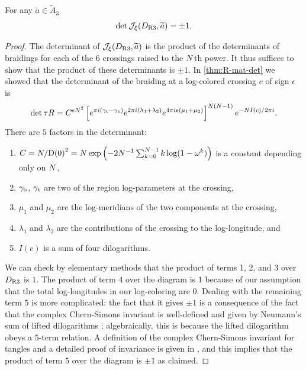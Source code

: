 \documentclass{sl2ams}
\numberwithin{equation}{section}
\begin{document}
\begin{lemma}
  \label{thm:cocyle-condition}
  For any \(\widetilde{a} \in \widetilde{A}_{3}\)
  \[
    \det \jfunc(D_{\RIII}, \widetilde a) = \pm 1
    .\qedhere
  \]
\end{lemma}
\begin{proof}
  The determinant of \(\jfunc(D_{\RIII}, \widetilde a)\) is the product of the determinants of braidings for each of the \(6\) crossings raised to the \(N\)th power.
  It thus suffices to show that the product of these determinants is \(\pm 1\).
  In \cref{thm:R-mat-det} we showed that the determinant of the braiding at a log-colored crossing \(c\) of sign \(\epsilon\) is
  \begin{equation*}
    \det \tau R
    =
    C^{\epsilon N^2}
    \left[
      e^{\pi i (\gamma_{\mathrm{t}} - \gamma_{\mathrm{b}}) }
      e^{2\pi i(\lambda_{1} + \lambda_{2})}
      e^{4\pi i \epsilon(\mu_{1} + \mu_{2})}
    \right]^{N(N-1)}
    e^{- N I(c) / 2\pi i}
    .
  \end{equation*}
  There are \(5\) factors in the determinant:
  \begin{enumerate}
    \item
      \(C = \nr/\df{0}^2 = \nr \exp\left( -2 \nr^{-1} \sum_{k=0}^{\nr-1} k \log(1 - \omega^{k}) \right)\) is a constant depending only on \(N\),
    \item
      \(\gamma_{\mathrm{b}}\), \(\gamma_{\mathrm{t}}\) are two of the region log-parameters at the crossing,
    \item \(\mu_1\) and \(\mu_{2}\) are the log-meridians of the two components at the crossing,
    \item
      \(\lambda_{1}\) and \(\lambda_{2}\) are the contributions of the crossing to the log-longitude, and
    \item 
      \(I(c)\) is a sum of four dilogarithms.
  \end{enumerate}

  We can check by elementary methods that the product of terms 1, 2, and 3 over \(D_{\operatorname{R3}}\) is \(1\).
  The product of term \(4\) over the diagram is \(1\) because of our assumption that the total log-longitudes in our log-coloring are \(0\).
  Dealing with the remaining term \(5\) is more complicated: the fact that it gives \(\pm 1\) is a consequence of the fact that the complex Chern-Simons invariant is well-defined and given by Neumann's sum of lifted dilogarithms \cite{Neumann2004}; algebraically, this is because the lifted dilogarithm obeys a \(5\)-term relation.
  A definition of the complex Chern-Simons invariant for tangles and a detailed proof of invariance is given in \cite{McPhailSnyderVolume}, and this implies that the product of term \(5\) over the diagram is \(\pm 1\) as claimed.
\end{proof}
\end{document}
